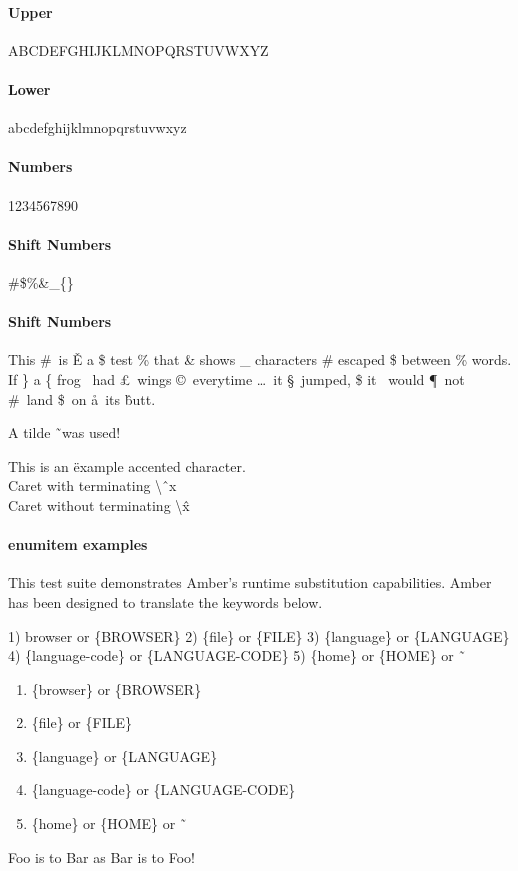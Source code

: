 \documentclass[14pt]{article}%
\begin{document}
%

\paragraph{Upper}
ABCDEFGHIJKLMNOPQRSTUVWXYZ

\paragraph{Lower}
abcdefghijklmnopqrstuvwxyz

\paragraph{Numbers}
1234567890

\paragraph{Shift Numbers}
\#\$\%\&\_\{\}

\paragraph{Shift Numbers}
This \#\ is \v{E} a \$ test \% that \& shows \_ characters \# escaped \$ between \%
words.  If \} a \{ frog \ddag\ had \pounds\ wings \copyright\ everytime \dots\
it \S\ jumped, \$ it \dag\ would \P\ not \#\ land \$\ on \aa\ its \^ butt.

A tilde \~\ was used!

This is an \"{e}xample accented character.
\\
Caret with terminating \textbackslash \^\ x
\\
Caret without terminating \textbackslash \^ x

\paragraph{enumitem examples}
\begin{description}[align=right,leftmargin=3.2cm,labelindent=3.0cm]
  \item[Purpose:]
    This test suite demonstrates Amber's runtime substitution capabilities.
    Amber has been designed to translate the keywords below.

    1) {browser} or \{BROWSER\}
    2) \{file\} or \{FILE\}
    3) \{language\} or \{LANGUAGE\}
    4) \{language-code\} or \{LANGUAGE-CODE\}
    5) \{home\} or \{HOME\} or \~\

    \begin{enumerate}
      \item \{browser\} or \{BROWSER\}
      \item \{file\} or \{FILE\}
      \item \{language\} or \{LANGUAGE\}
      \item \{language-code\} or \{LANGUAGE-CODE\}
      \item \{home\} or \{HOME\} or \~\
    \end{enumerate}

  \item[Foo:] Foo is to Bar as Bar is to Foo!

\end{description}
\end{document}
